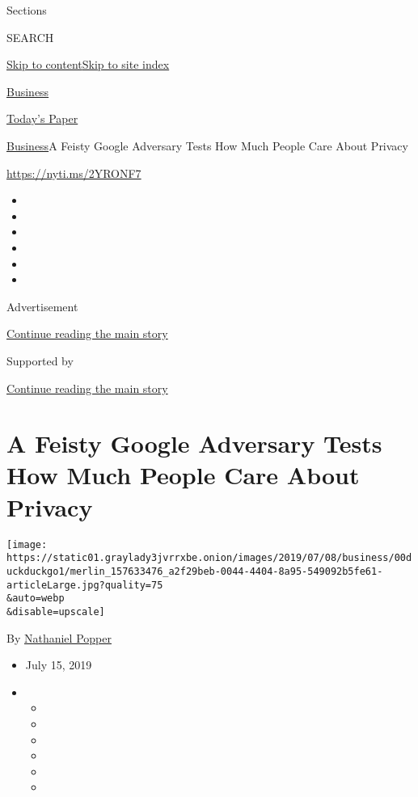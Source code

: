 Sections

SEARCH

\protect\hyperlink{site-content}{Skip to
content}\protect\hyperlink{site-index}{Skip to site index}

\href{https://www.nytimes3xbfgragh.onion/section/business}{Business}

\href{https://myaccount.nytimes3xbfgragh.onion/auth/login?response_type=cookie\&client_id=vi}{}

\href{https://www.nytimes3xbfgragh.onion/section/todayspaper}{Today's
Paper}

\href{/section/business}{Business}\textbar{}A Feisty Google Adversary
Tests How Much People Care About Privacy

\href{https://nyti.ms/2YRONF7}{https://nyti.ms/2YRONF7}

\begin{itemize}
\item
\item
\item
\item
\item
\item
\end{itemize}

Advertisement

\protect\hyperlink{after-top}{Continue reading the main story}

Supported by

\protect\hyperlink{after-sponsor}{Continue reading the main story}

\hypertarget{a-feisty-google-adversary-tests-how-much-people-care-about-privacy}{%
\section{A Feisty Google Adversary Tests How Much People Care About
Privacy}\label{a-feisty-google-adversary-tests-how-much-people-care-about-privacy}}

\texttt{[image: https://static01.graylady3jvrrxbe.onion/images/2019/07/08/business/00duckduckgo1/merlin\_157633476\_a2f29beb-0044-4404-8a95-549092b5fe61-articleLarge.jpg?quality=75\\\&auto=webp\\\&disable=upscale]}

By
\href{https://www.nytimes3xbfgragh.onion/by/nathaniel-popper}{Nathaniel
Popper}

\begin{itemize}
\item
  July 15, 2019
\item
  \begin{itemize}
  \item
  \item
  \item
  \item
  \item
  \item
  \end{itemize}
\end{itemize}

